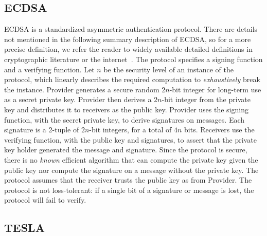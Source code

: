 \documentclass[APA,STIX1COL]{IONjournal/ION-APA Template}
\begin{document}
	\subsection{ECDSA} \label{sub:ecdsa}

		ECDSA is a standardized asymmetric authentication protocol.
		There are details not mentioned in the following summary description of ECDSA, so for a more precise definition, we refer the reader to widely available detailed definitions in cryptographic literature or the internet~\cite{boneh2017graduate}.
		The protocol specifies a signing function and a verifying function.
		Let $n$ be the security level of an instance of the protocol, which linearly describes the required computation to {\em exhaustively} break the instance.
		Provider generates a secure random $2n$-bit integer for long-term use as a secret private key.
		Provider then derives a $2n$-bit integer from the private key and distributes it to receivers as the public key.
		Provider uses the signing function, with the secret private key, to derive signatures on messages.
		Each signature is a 2-tuple of $2n$-bit integers, for a total of $4n$ bits.
		Receivers use the verifying function, with the public key and signatures, to assert that the private key holder generated the message and signature.
		Since the protocol is secure, there is no {\em known} efficient algorithm that can compute the private key given the public key nor compute the signature on a message without the private key.
		The protocol assumes that the receiver trusts the public key as from Provider.
		The protocol is not loss-tolerant: if a single bit of a signature or message is lost, the protocol will fail to verify.

	\subsection{TESLA} \label{sub:tesla}
\end{document}
